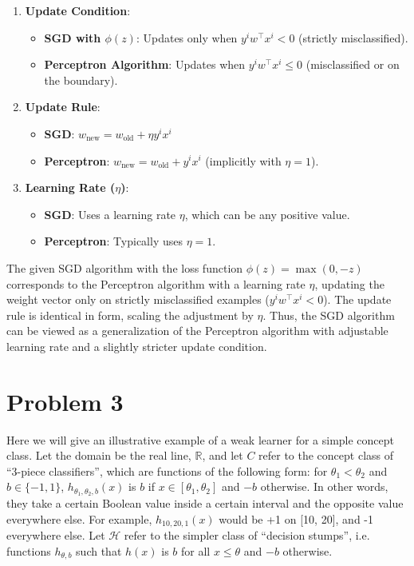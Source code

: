 \documentclass{article}
\begin{document}
\begin{enumerate}
\item \textbf{Update Condition}:
\begin{itemize}
\item \textbf{SGD with $\phi(z)$}: Updates only when $y^i w^\top x^i < 0$ (strictly misclassified).
\item \textbf{Perceptron Algorithm}: Updates when $y^i w^\top x^i \leq 0$ (misclassified or on the boundary).
\end{itemize}

\item \textbf{Update Rule}:
\begin{itemize}
\item \textbf{SGD}: $w_{\text{new}} = w_{\text{old}} + \eta y^i x^i$
\item \textbf{Perceptron}: $w_{\text{new}} = w_{\text{old}} + y^i x^i$ (implicitly with $\eta = 1$).
\end{itemize}

\item \textbf{Learning Rate ($\eta$)}:
\begin{itemize}
\item \textbf{SGD}: Uses a learning rate $\eta$, which can be any positive value.
\item \textbf{Perceptron}: Typically uses $\eta = 1$.
\end{itemize}
\end{enumerate}

The given SGD algorithm with the loss function $\phi(z) = \max(0, -z)$ corresponds to the Perceptron algorithm with a learning rate $\eta$, updating the weight vector only on strictly misclassified examples ($y^i w^\top x^i < 0$). The update rule is identical in form, scaling the adjustment by $\eta$. Thus, the SGD algorithm can be viewed as a generalization of the Perceptron algorithm with adjustable learning rate and a slightly stricter update condition.

\section*{Problem 3}

\textbf{} Here we will give an illustrative example of a weak learner for a simple concept class. Let the domain be the real line, \(\mathbb{R}\), and let \(C\) refer to the concept class of “3-piece classifiers”, which are functions of the following form: for \(\theta_1 < \theta_2\) and \(b \in \{-1, 1\}\), \(h_{\theta_1, \theta_2, b}(x)\) is \(b\) if \(x \in [\theta_1, \theta_2]\) and \(-b\) otherwise. In other words, they take a certain Boolean value inside a certain interval and the opposite value everywhere else. For example, \(h_{10, 20, 1}(x)\) would be +1 on [10, 20], and -1 everywhere else. Let \(\mathcal{H}\) refer to the simpler class of “decision stumps”, i.e. functions \(h_{\theta, b}\) such that \(h(x)\) is \(b\) for all \(x \leq \theta\) and \(-b\) otherwise.
\end{document}
